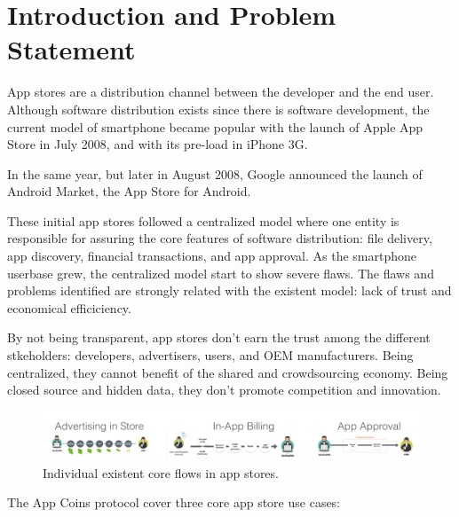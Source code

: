 
\section{Introduction and Problem Statement}



App stores are a distribution channel between the developer and the end user. Although software distribution exists since there is software development, the current model of smartphone became popular with the launch of Apple App Store in July 2008, and with its pre-load in iPhone 3G.

In the same year, but later in August 2008, Google announced the launch of Android Market\cite{wiki:market}, the App Store for Android.

These initial app stores followed a centralized model where one entity is responsible for assuring the core features of software distribution: file delivery, app discovery, financial transactions, and app approval. As the smartphone userbase grew, the centralized model start to show severe flaws. The flaws and problems identified are strongly related with the existent model: lack of trust and economical efficiciency. 

By not being transparent, app stores don't earn the trust among the different stkeholders: developers, advertisers, users, and OEM manufacturers. Being centralized, they cannot benefit of the shared and crowdsourcing economy. Being closed source and hidden data, they don't promote competition and innovation.

\begin{figure}[!ht]
\centering
\includegraphics[width=\textwidth]{diagrams/current_flows.png}
\caption{Individual existent core flows in app stores.}
\label{fig:exist_flows}
\end{figure}


The App Coins protocol cover three core app store use cases:

